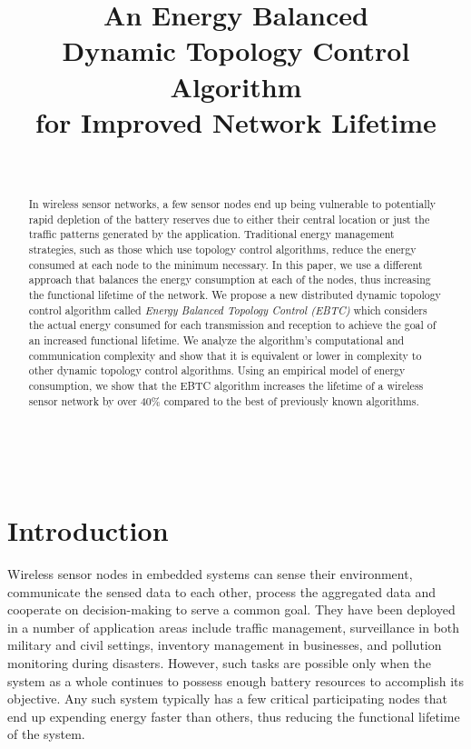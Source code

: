 \documentclass[journal,12pt,onecolumn]{IEEEtran}
\begin{document}
\title{An Energy Balanced\\Dynamic Topology Control Algorithm\\for Improved Network Lifetime}
\author{\\
}

\maketitle
\thispagestyle{empty}
~\vskip 0.5in
\begin{abstract}
In wireless sensor networks, a few sensor nodes end up being
vulnerable to potentially rapid depletion of the battery reserves due
to either their central location or just the traffic patterns
generated by the application. Traditional energy management strategies, 
such as those which use topology control algorithms, reduce the energy
consumed at each node to the minimum necessary. In this paper, we use
a different approach that balances the energy consumption at each of
the nodes, thus increasing the functional lifetime of the network. We
propose a new distributed dynamic topology control algorithm called
{\em Energy Balanced Topology Control (EBTC)} which considers the
actual energy consumed for each transmission and reception to achieve
the goal of an increased functional lifetime. We analyze the
algorithm's computational and communication complexity and show that
it is equivalent or lower in complexity to other dynamic topology
control algorithms. Using an empirical model of energy
consumption, we show that the EBTC algorithm increases the lifetime of
a wireless sensor network by over 40\% compared to the best of
previously known algorithms. 
\end{abstract}

\newpage
\section{Introduction}
Wireless sensor nodes in embedded systems can sense their environment,
communicate the sensed data to each other, process the aggregated data and
cooperate on decision-making to serve a common goal. They have been deployed in a number of application areas include
traffic management, surveillance in both military and civil
settings, inventory management in businesses, and pollution monitoring
during disasters. However, such
tasks are possible only when the system as a whole continues to
possess enough battery resources to accomplish its objective. Any such
system typically has a few critical participating nodes that end up
expending energy faster than others, thus reducing the functional
lifetime of the system.
\end{document}
